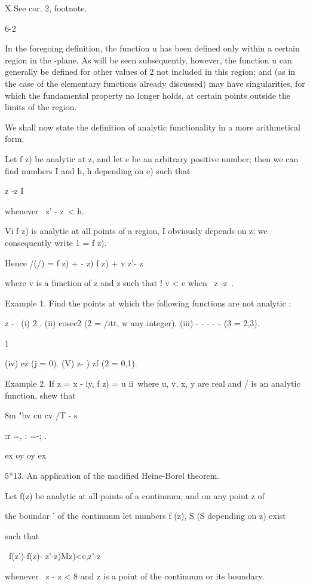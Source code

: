 X See cor. 2, footnote.

6-2

%
%

In the foregoing definition, the function u has been defined only
within a certain region in the -plane. As will be seen subsequently,
however, the function u can generally be defined for other values of 2
not included in this region; and (as in the case of the elementary
functions already discussed) may have singularities, for which the
fundamental property no longer holds, at certain points outside the
limits of the region.

We shall now state the definition of analytic functionality in a more
arithmetical form.

Let f z) be analytic at z, and let e be an arbitrary positive number;
then we can find numbers I and h, h depending on e) such that

z -z I

whenever \ z' - z\ < h.

Vi f z) is analytic at all points of a region, I obviously depends on
z; we consequently write 1 = f z).

Hence /(/) = f z) + - z) f z) + v z'- z\

where v is a function of z and z such that ! v < e when \ z -z\ < t>.

Example 1. Find the points at which the following functions are not
analytic :

z - \ (i) 2 . (ii) cosec2 (2 = /itt, w any integer). (iii) - - - - -
(3 = 2,3).

1

(iv) ez (j = 0). (V) z- ) zf (2 = 0,1).

Example 2. If z = x - iy, f z) = u ii\ where u, v, x, y are real and /
is an analytic function, shew that

8m "bv cu cv /T - s

 :r =, : =-; . 

ex oy oy ex

5*13. An application of the modified Heine-Borel theorem.

Let f(z) be analytic at all points of a continuum; and on any point z
of

the boundar ' of the continuum let numbers f (z), S (S depending on z)
exist

such that

\ f(z')-f(z)- z'-z)Mz)<e,z'-z\

whenever \ z - z < 8 and z is a point of the continuum or its
boundary.

